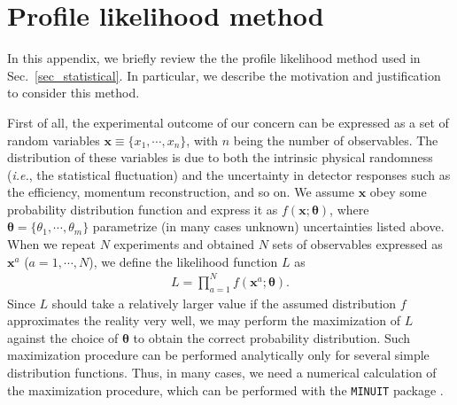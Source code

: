 \documentclass[12pt,twoside,book]{article}
\begin{document}
\section{Profile likelihood method}
\label{sec:profile}

\vskip 0.1in

In this appendix, we briefly review the the profile likelihood method used in Sec.~\ref{sec_statistical}.
In particular, we describe the motivation and justification to consider this method.

First of all, the experimental outcome of our concern can be expressed as a set of random variables $\bm{x} \equiv \{ x_1, \cdots, x_n \}$, with $n$ being the number of observables.
The distribution of these variables is due to both the intrinsic physical randomness (\textit{i.e.}, the statistical fluctuation) and the uncertainty in detector responses such as the efficiency, momentum reconstruction, and so on.
We assume $\bm{x}$ obey some probability distribution function and express it as $f(\bm{x} ; \bm{\theta})$, where $\bm{\theta} = \{ \theta_1, \cdots, \theta_m \}$ parametrize (in many cases unknown) uncertainties listed above.
When we repeat $N$ experiments and obtained $N$ sets of observables expressed as $\bm{x}^a$ ($a = 1,\cdots,N$), we define the likelihood function $L$ as
\begin{align}
  L = \prod_{a=1}^N f(\bm{x}^a ; \bm{\theta}).
\end{align}
Since $L$ should take a relatively larger value if the assumed distribution $f$ approximates the reality very well, we may perform the maximization of $L$ against the choice of $\bm{\theta}$ to obtain the correct probability distribution.
Such maximization procedure can be performed analytically only for several simple distribution functions.
Thus, in many cases, we need a numerical calculation of the maximization procedure, which can be performed with the \texttt{MINUIT} package \cite{James:1994vla}.
\end{document}
